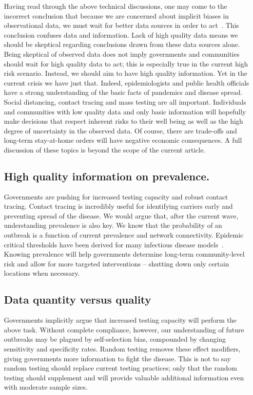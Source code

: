 \documentclass[aoas]{amsart}
\begin{document}
Having read through the above technical discussions, one may come to the incorrect conclusion that because we are concerned about implicit biases in observational data, we must wait for better data sources in order to act~\citep{Ioannidis2020}.  This conclusion confuses data and information.  Lack of high quality data means we should be skeptical regarding conclusions drawn from these data sources alone.  Being skeptical of observed data does not imply governments and communities should wait for high quality data to act; this is especially true in the current high risk scenario.  Instead, we should aim to have high quality information.  Yet in the current crisis we have just that.  Indeed, epidemiologists and public health officials have a strong understanding of the basic facts of pandemics and disease spread.  Social distancing, contact tracing and mass testing are all important.  Individuals and communities with low quality data and only basic information will hopefully make decisions that respect inherent risks to their well being as well as the high degree of uncertainty in the observed data. Of course, there are trade-offs and long-term stay-at-home orders will have negative economic consequences.  A full discussion of these topics is beyond the scope of the current article.

\subsection*{High quality information on prevalence.}

Governments are pushing for increased testing capacity and robust contact tracing.  Contact tracing is incredibly useful for identifying carriers early and preventing spread of the disease.  We would argue that, after the current wave, understanding prevalence is also key.  We know that the probability of an outbreak is a function of current prevalence and network connectivity.  Epidemic critical thresholds have been derived for many infectious disease models~\cite{Pastor2001,Newman2002,Parshani2010}.  Knowing prevalence will help governments determine long-term community-level risk and allow for more targeted interventions -- shutting down only certain locations when necessary.

\subsection*{Data quantity versus quality}

Governments implicitly argue that increased testing capacity will perform the above task.  Without complete compliance, however, our understanding of future outbreaks may be plagued by self-selection bias, compounded by changing sensitivity and specificity rates. Random testing removes these effect modifiers, giving governments more information to fight the disease.  This is not to say random testing should replace current testing practices; only that the random testing should supplement and will provide valuable additional information even with moderate sample sizes.
\end{document}
